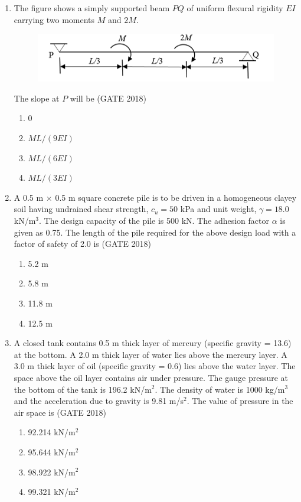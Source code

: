\documentclass[journal,12pt,onecolumn]{IEEEtran}
\theoremstyle{remark}
\begin{document}
\begin{enumerate}
\item The figure shows a simply supported beam $PQ$ of uniform flexural rigidity $EI$ carrying two moments $M$ and $2M$.
\begin{figure}[h]
    \centering
    \includegraphics[width=0.5\linewidth]{GATE-CE-2018/30-1.png}
    \caption{}
    \label{30-1}
\end{figure}
The slope at $P$ will be
\hfill{(GATE 2018)}
\begin{multicols}{4}
\begin{enumerate}
    \item 0
    \item $ML/(9EI)$
    \item $ML/(6EI)$
    \item $ML/(3EI)$
\end{enumerate}
\end{multicols}
\vspace{1cm}
\newpage
\item A 0.5 m $\times$ 0.5 m square concrete pile is to be driven in a homogeneous clayey soil having undrained shear strength, $c_u = 50$ kPa and unit weight, $\gamma = 18.0$ kN/m$^3$. The design capacity of the pile is 500 kN. The adhesion factor $\alpha$ is given as 0.75. The length of the pile required for the above design load with a factor of safety of 2.0 is
\hfill{(GATE 2018)}
\begin{multicols}{4}
\begin{enumerate}
    \item 5.2 m
    \item 5.8 m
    \item 11.8 m
    \item 12.5 m
\end{enumerate}
\end{multicols}
\vspace{1cm}

\item A closed tank contains 0.5 m thick layer of mercury (specific gravity = 13.6) at the bottom. A 2.0 m thick layer of water lies above the mercury layer. A 3.0 m thick layer of oil (specific gravity = 0.6) lies above the water layer. The space above the oil layer contains air under pressure. The gauge pressure at the bottom of the tank is 196.2 kN/m$^2$. The density of water is 1000 kg/m$^3$ and the acceleration due to gravity is 9.81 m/s$^2$. The value of pressure in the air space is
\hfill{(GATE 2018)}
\begin{multicols}{4}
\begin{enumerate}
    \item 92.214 kN/m$^2$
    \item 95.644 kN/m$^2$
    \item 98.922 kN/m$^2$
    \item 99.321 kN/m$^2$
\end{enumerate}
\end{multicols}
\vspace{1cm}


\end{enumerate}
\end{document}
